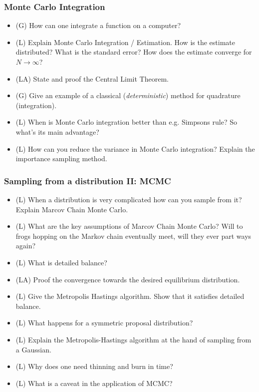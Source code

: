 \subsubsection*{Monte Carlo Integration}
\begin{itemize}
    \item (G) How can one integrate a function on a computer?
    \answerboxM
    \item (L) Explain Monte Carlo Integration / Estimation. How is the estimate distributed? What is the standard error? How does the estimate converge for $N \rightarrow \infty$?
    \answerboxL
    \item (LA) State and proof the Central Limit Theorem.
    \answerboxL
    \item (G) Give an example of a classical (\textit{deterministic}) method for quadrature (integration).
    \answerboxM
    \item (L) When is Monte Carlo integration better than e.g. Simpsons rule? So what's its main advantage?
    \answerboxL
    \item (L) How can you reduce the variance in Monte Carlo integration? Explain the importance sampling method.
    \answerboxL
\end{itemize}

\subsubsection*{Sampling from a distribution II: MCMC}

\begin{itemize}
    \item (L) When a distribution is very complicated how can you sample from it? Explain Marcov Chain Monte Carlo.
    \answerboxM
    \item (L) What are the key assumptions of Marcov Chain Monte Carlo? Will to frogs hopping on the Markov chain eventually meet, will they ever part ways again?
    \answerboxM
    \item (L) What is detailed balance?
    \answerboxM
    \item (LA) Proof the convergence towards the desired equilibrium distribution.
    \answerboxL
    \item (L) Give the Metropolis Hastings algorithm. Show that it satisfies detailed balance.
    \answerboxL
    \item (L) What happens for a symmetric proposal distribution?
    \answerboxM
    \item (L) Explain the Metropolis-Hastings algorithm at the hand of sampling from a Gaussian.
    \answerboxL
    \item (L) Why does one need thinning and burn in time?
    \answerboxM
    \item (L) What is a caveat in the application of MCMC?
    \answerboxM
\end{itemize}

